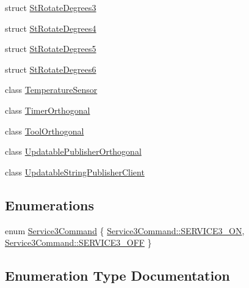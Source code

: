 \begin{DoxyCompactItemize}
\item 
struct \hyperlink{structsm__dance__bot_1_1StRotateDegrees3}{St\+Rotate\+Degrees3}
\item 
struct \hyperlink{structsm__dance__bot_1_1StRotateDegrees4}{St\+Rotate\+Degrees4}
\item 
struct \hyperlink{structsm__dance__bot_1_1StRotateDegrees5}{St\+Rotate\+Degrees5}
\item 
struct \hyperlink{structsm__dance__bot_1_1StRotateDegrees6}{St\+Rotate\+Degrees6}
\item 
class \hyperlink{classsm__dance__bot_1_1TemperatureSensor}{Temperature\+Sensor}
\item 
class \hyperlink{classsm__dance__bot_1_1TimerOrthogonal}{Timer\+Orthogonal}
\item 
class \hyperlink{classsm__dance__bot_1_1ToolOrthogonal}{Tool\+Orthogonal}
\item 
class \hyperlink{classsm__dance__bot_1_1UpdatablePublisherOrthogonal}{Updatable\+Publisher\+Orthogonal}
\item 
class \hyperlink{classsm__dance__bot_1_1UpdatableStringPublisherClient}{Updatable\+String\+Publisher\+Client}
\end{DoxyCompactItemize}
\subsection*{Enumerations}
\begin{DoxyCompactItemize}
\item 
enum \hyperlink{namespacesm__dance__bot_a2d0902aa29698165effd2c3248a9c8ff}{Service3\+Command} \{ \hyperlink{namespacesm__dance__bot_a2d0902aa29698165effd2c3248a9c8ffa13cdca48a01bbb44fa8fb35567fbc58e}{Service3\+Command\+::\+S\+E\+R\+V\+I\+C\+E3\+\_\+\+ON}, 
\hyperlink{namespacesm__dance__bot_a2d0902aa29698165effd2c3248a9c8ffa642ed22a7f6b816840289b4256116e9e}{Service3\+Command\+::\+S\+E\+R\+V\+I\+C\+E3\+\_\+\+O\+FF}
 \}
\end{DoxyCompactItemize}


\subsection{Enumeration Type Documentation}

